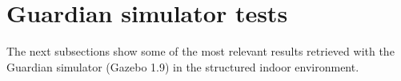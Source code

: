 \clearpage
\section{Guardian simulator tests}

The next subsections show some of the most relevant results retrieved with the Guardian simulator (Gazebo 1.9) in the structured indoor environment.




